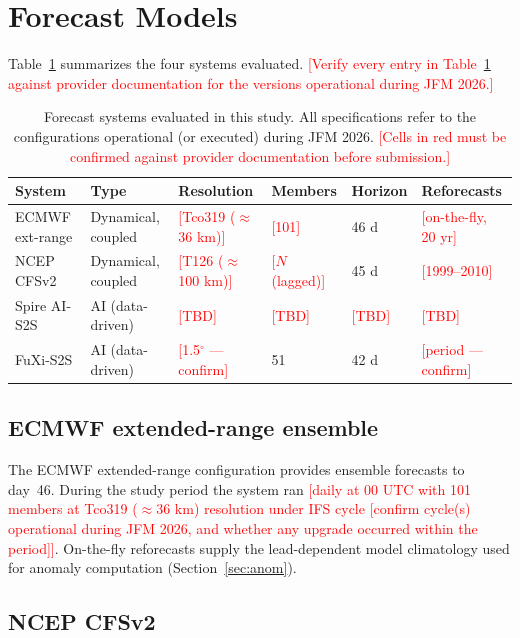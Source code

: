 \documentclass[11pt]{article}
\newcommand{\ph}[1]{\textcolor{red}{[#1]}}
\begin{document}
\section{Forecast Models}\label{sec:models}

Table~\ref{tab:models} summarizes the four systems evaluated.
\ph{Verify every entry in Table~\ref{tab:models} against provider
documentation for the versions operational during JFM 2026.}

\begin{table}[t]
  \caption{Forecast systems evaluated in this study. All
  specifications refer to the configurations operational (or executed)
  during JFM 2026. \ph{Cells in red must be confirmed against provider
  documentation before submission.}}
  \label{tab:models}
  \centering
  \small
  \setlength{\tabcolsep}{4pt}
  \begin{tabular}{llllll}
    \toprule
    System & Type & Resolution & Members & Horizon & Reforecasts \\
    \midrule
    ECMWF ext-range & Dynamical, coupled & \ph{Tco319 ($\approx$36 km)} & \ph{101} & 46 d & \ph{on-the-fly, 20 yr} \\
    NCEP CFSv2      & Dynamical, coupled & \ph{T126 ($\approx$100 km)}  & \ph{$N$ (lagged)} & 45 d & \ph{1999--2010} \\
    Spire AI-S2S    & AI (data-driven)   & \ph{TBD}                     & \ph{TBD} & \ph{TBD} & \ph{TBD} \\
    FuXi-S2S        & AI (data-driven)   & \ph{1.5$^{\circ}$ --- confirm} & 51 & 42 d & \ph{period --- confirm} \\
    \bottomrule
  \end{tabular}
\end{table}

\subsection{ECMWF extended-range ensemble}\label{sec:ecmwf}

The ECMWF extended-range configuration \citep{vitart2014} provides
ensemble forecasts to day~46. During the study period the system ran
\ph{daily at 00 UTC with 101 members at Tco319 ($\approx$36 km)
resolution under IFS cycle [confirm cycle(s) operational during JFM
2026, and whether any upgrade occurred within the period]}. On-the-fly
reforecasts supply the lead-dependent model climatology used for
anomaly computation (Section~\ref{sec:anom}).

\subsection{NCEP CFSv2}\label{sec:ncep}
\end{document}
